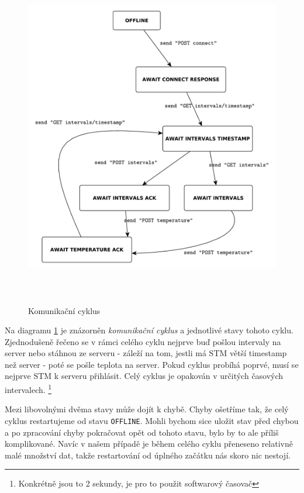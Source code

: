 \begin{figure}[tbh!]\centering
\includegraphics[width=\textwidth, height=150mm]{../diagrams/stm_komunikacni_cyklus.pdf}
\caption{Komunikační cyklus}
\label{stm-komunikacni-cyklus}
\end{figure}

Na diagramu \ref{stm-komunikacni-cyklus} je znázorněn \emph{komunikační cyklus} a jednotlivé stavy tohoto cyklu.
Zjednodušeně řečeno se v rámci celého cyklu nejprve buď pošlou intervaly na server nebo stáhnou ze
serveru - záleží na tom, jestli má STM větší timestamp než server - poté se pošle teplota na server.
Pokud cyklus probíhá poprvé, musí se nejprve STM k serveru přihlásit.
Celý cyklus je opakován v určitých časových intervalech.
\footnote{Konkrétně jsou to 2 sekundy, je pro to použit softwarový časovač}

Mezi libovolnými dvěma stavy může dojít k chybě.
Chyby ošetříme tak, že celý cyklus restartujeme od stavu \texttt{OFFLINE}.
Mohli bychom sice uložit stav před chybou a po zpracování chyby pokračovat opět od tohoto stavu,
bylo by to ale příliš komplikované.
Navíc v našem případě je během celého cyklu přeneseno relativně malé množství dat, takže restartování
od úplného začátku nás skoro nic nestojí.


